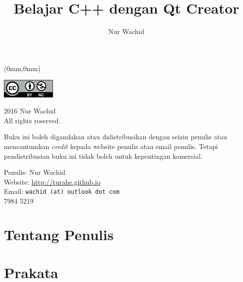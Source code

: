 \documentclass[11pt,b5paper,oneside,titlepage]{book}
\makeatletter
\renewcommand{\cleardoublepage}{
	\clearpage\ifodd\c@page\else
	\hbox{}
	\vspace*{\fill}
	\thispagestyle{empty}
	\newpage
	\fi}
\makeatother
\begin{document}
	\dominitoc 
	\begingroup  
	\thispagestyle{empty}
	\begin{textblock*}{297mm}(0mm,0mm)
	\end{textblock*}
	\endgroup
	\title{Belajar C++ dengan Qt Creator}
	\author{Nur Wachid}
	\cleardoublepage
	\frontmatter

	\begingroup
	\parskip \baselineskip
	\thispagestyle{empty}

\noindent \includegraphics[width=0.2\textwidth]{../manuscript/images/cc-by-nc}

\noindent \textcopyright{} 2016 Nur Wachid \\
	All rights reserved.
	
	Buku ini boleh digandakan atau didistribusikan dengan
	seizin penulis atau mencantumkan \emph{credit} kepada
	website penulis atau email penulis. Tetapi pendistribusian
	buku ini tidak boleh untuk kepentingan komersial.
	
\noindent Penulis: Nur Wachid \\
	Website: \url{http://turahe.github.io}  \\
	Email: \texttt{wachid  (at) outlook dot com} \\
	 7984 5219
	
	\chapter{Tentang Penulis}
	
	
	\endgroup
	\tableofcontents
	\lstlistoflistings

	\clearpage
	\newpage
	\chapter{Prakata}
	
	\newpage
	\cleardoublepage
	\mainmatter

\end{document}
